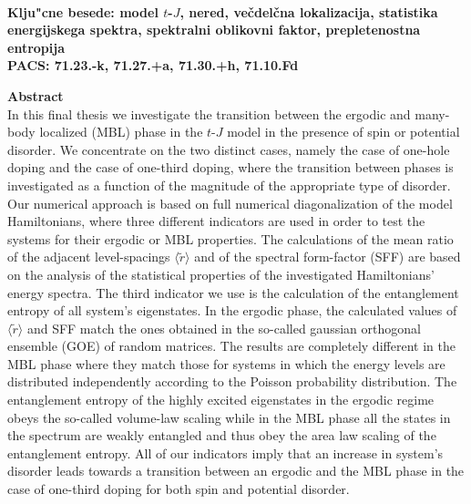 \vspace{1cm}\\
{\bf Klju"cne besede: model $t$-$J$, nered, večdelčna lokalizacija, statistika energijskega spektra, spektralni oblikovni faktor, prepletenostna entropija}\\
{\bf PACS: 71.23.-k, 71.27.+a, 71.30.+h, 71.10.Fd}


\cleardoublepage
{\Large \bf Abstract}
\vspace{1cm}\\
In this final thesis we investigate the transition between the ergodic and many-body localized (MBL) phase in the $t$-$J$ model in the presence of spin or potential disorder. We concentrate on the two distinct cases, namely the case of one-hole doping and the case of one-third doping, where the transition between phases is investigated as a function of the magnitude of the appropriate type of disorder. Our numerical approach is based on full numerical diagonalization of the model Hamiltonians, where three different indicators are used in order to test the systems for their ergodic or MBL properties. The calculations of the mean ratio of the adjacent level-spacings $\langle \tilde{r}\rangle$ and of the spectral form-factor (SFF) are based on the analysis of the statistical properties of the investigated Hamiltonians' energy spectra. The third indicator we use is the calculation of the entanglement entropy of all system's eigenstates. In the ergodic phase, the calculated values of $\langle\tilde{r}\rangle$ and SFF match the ones obtained in the so-called gaussian orthogonal ensemble (GOE) of random matrices. The results are completely different in the MBL phase where they match those for systems in which the energy levels are distributed independently according to the Poisson probability distribution. The entanglement entropy of the highly excited eigenstates in the ergodic regime obeys the so-called volume-law scaling while in the MBL phase all the states in the spectrum are weakly entangled and thus obey the area law scaling of the entanglement entropy. All of our indicators imply that an increase in system's disorder leads towards a transition between an ergodic and the MBL phase in the case of one-third doping for both spin and potential disorder.
